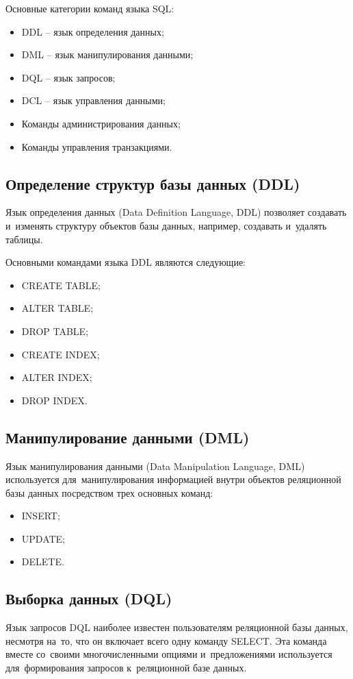 \documentclass{ou}
\begin{document}
Основные категории команд языка SQL:
\begin{itemize}[label=-, itemindent=4em, nosep]
\item DDL -- язык определения данных;
\item DML -- язык манипулирования данными;
\item DQL -- язык запросов;
\item DCL -- язык управления данными;
\item Команды администрирования данных;
\item Команды управления транзакциями.
\end{itemize}

\subsection{Определение структур базы данных (DDL)}
Язык определения данных (Data Definition Language, DDL) позволяет создавать и~изменять структуру объектов базы данных, например, создавать и~удалять таблицы.

Основными командами языка DDL являются следующие:

\begin{itemize}[label=-, itemindent=4em, nosep]
\item CREATE TABLE;
\item ALTER TABLE;
\item DROP TABLE;
\item CREATE INDEX;
\item ALTER INDEX;
\item DROP INDEX.
\end{itemize}

\subsection{Манипулирование данными (DML)}
Язык манипулирования данными (Data Manipulation Language, DML) используется для~манипулирования информацией внутри объектов реляционной базы данных посредством трех основных команд:

\begin{itemize}[label=-, itemindent=4em, nosep]
\item INSERT;
\item UPDATE;
\item DELETE.
\end{itemize}

\subsection{Выборка данных (DQL)}
Язык запросов DQL наиболее известен пользователям реляционной базы данных, несмотря на~то, что он включает всего одну команду SELECT. Эта команда вместе со~своими многочисленными опциями и~предложениями используется для~формирования запросов к~реляционной базе данных.
\end{document}
